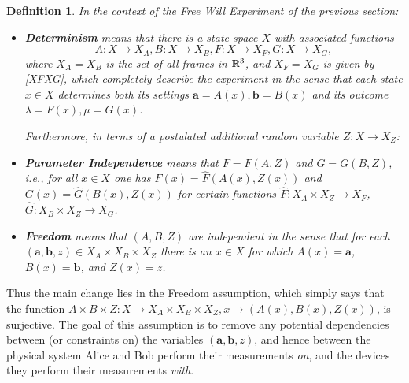 \documentclass[12pt]{article}
\newtheorem{Definition}{Definition}[section]
\newcommand{\raw}{\rightarrow} \newcommand{\rat}{\mapsto}
\newcommand{\x}{\times} \newcommand{\hb}{\hbar}
\newcommand{\er}{\eqref}
\newcommand{\lm}{\lambda} \newcommand{\Lm}{\Lambda}
\newcommand{\ba}{\mathbf{a}}\newcommand{\bb}{\mathbf{b}}
\begin{document}
\begin{Definition}\label{FWTDEFS}
In the context of the Free Will Experiment of the previous section:
\begin{itemize}
\item 
\textbf{Determinism} means that there is a state space $X$  with associated functions $$A: X\raw X_A, B:X\raw X_B, F:X\raw X_F, G:X\raw X_G,$$ where $X_A=X_B$ is  the set of all frames in ${\mathbb R}^3$, and $X_F=X_G$ is given by \er{XFXG},
which completely describe the experiment in the sense that each state $x\in X$ determines both its settings $\ba=A(x),\bb=B(x)$ and its outcome $\lm=F(x),\mu=G(x)$. 

Furthermore, in terms of a postulated additional random variable $Z:X\raw X_Z$:
\item \textbf{Parameter Independence}  means that 
$F=F(A,Z)$ and $G=G(B,Z)$,
 i.e., for all $x\in X$ one has $F(x)=\hat{F}(A(x),Z(x))$ and $G(x)=\hat{G}(B(x),Z(x))$ for certain functions
  $\hat{F}:X_A \x X_Z\raw X_F$, $\hat{G}:X_B\x X_Z\raw X_G$.
\item \textbf{Freedom} means that
 $(A,B,Z)$ are independent in the sense that for each $(\ba,\bb,z)\in X_A\x X_B\x X_Z$ there is an $x\in X$  for which $A(x)=\ba$, $B(x)=\bb$, and $Z(x)=z$.
\end{itemize}
\end{Definition}
Thus the main change lies in the Freedom assumption, which simply says that the function $A\x B\x Z:X\raw X_A\x X_B\x X_Z, x\mapsto (A(x),B(x),Z(x))$, is surjective. The goal of this assumption is to remove any potential  dependencies between (or constraints on)  the variables  $(\ba,\bb,z)$, and hence between the physical system Alice and Bob perform their measurements \emph{on}, and the devices they perform their measurements \emph{with}.
\end{document}
